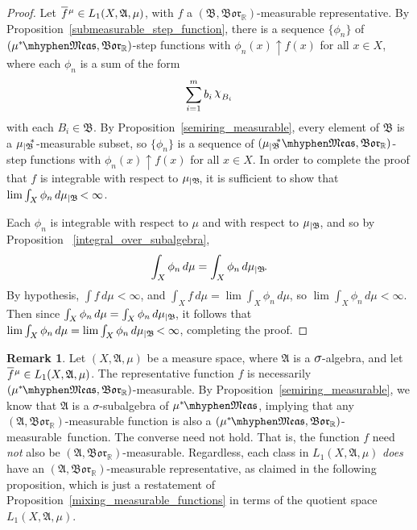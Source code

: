 \documentclass[
twoside=true,
paper=letter,
fontsize=9pt,
pagesize=auto,
leqno,
openany,
headsepline,
overfullrule,
]{scrbook}
\theoremstyle{plain}
\theoremstyle{plain}
\theoremstyle{definition}
\newtheorem{rmk}[thm]{Remark}
\theoremstyle{bfnoteitalic}
\theoremstyle{bfnoteroman}
\newcommand{\sigalg}[1]{\mathfrak{#1}}
\newcommand{\borel}{\mathfrak{Bor}}
\newcommand{\textsigma}{\hbox{\large{$\sigma$}}\kern-1pt}
\newcommand{\charfunction}[1]{\mathop{{\raisebox{2pt}{$\chi$}}_{#1}}}
\newcommand{\restrictedto}[1]{_{\lvert#1}\kern-1.5pt}
\newcommand{\R}{\mathbb{R}}
\newcommand{\sigmaalgebra}{\sigalg{A}}
\newcommand{\sigmaalgebraii}{\sigalg{B}}
\newcommand{\measurable}[1]{{#1}\mhyphen\mathfrak{Meas}}
\newcommand{\kernast}{\ast\kern-1pt}
\newcommand{\mbmeasurable}{$(\measurable{\measure^\kernast},\borel_\R)$\hyp{}measurable}
\newcommand{\measuresubstar}[1]{\measure\restrictedto{#1}\kern-2pt^*}
\newcommand{\funcf}{f}
\newcommand{\measurespace}{X}
\newcommand{\measure}{\mu}
\newcommand{\measmu}{\mu}
\newcommand{\setii}{B}
\newcommand*\xbar[1]{%
   \hbox{%
     \vbox{%
       \hrule height 0.4pt %
       \kern0.4ex%
       \hbox{%
         \ensuremath{#1}%
       }%
     }%
   }%
}
\newcommand{\lebclass}[1]{\hspace{.5pt}\xbar{#1}\hspace{0.5pt}}
\newcommand{\ellclass}[2]{\lebclass{#1}^{#2}}
\begin{document}
\begin{proof}
Let
$\ellclass{\funcf}{\measmu} \in L_1(\measurespace, \sigmaalgebra, \measure)$,
with $\funcf$ a
$(\sigmaalgebraii, \borel_\R)$\hyp{}measurable representative.
By Proposition~\ref{submeasurable_step_function}, there is a sequence
$\{ \phi_n \}$ of
$(\measurable{\measmu^\kernast}, \borel_\R)$\hyp{}step functions with
$\phi_n(x) \uparrow f(x)$ for all $x\in\measurespace$, where each $\phi_n$ is a sum of the form
\[
\sum_{i=1}^m b_i \charfunction{\setii_i}
\]
with each $\setii_i \in \sigmaalgebraii$.
By Proposition~\ref{semiring_measurable}, every element of $\sigmaalgebraii$ is a $\measuresubstar{\sigmaalgebraii}$-measurable subset,
so $\{\phi_n\}$ is a sequence of $(\measurable{\measuresubstar{\sigmaalgebraii}},\borel_\R)$-step functions with
$\phi_n(x) \uparrow f(x)$ for all $x\in\measurespace$.
In order to complete the proof that $f$ is integrable with respect to
$\measmu\restrictedto{\sigmaalgebraii}$, it is sufficient to show that
$\lim \int_\measurespace \phi_n \, d \measure\restrictedto{\sigmaalgebraii} < \infty$.

Each $\phi_n$ is integrable with respect to $\measmu$ and with respect to
$\measmu\restrictedto{\sigmaalgebraii}$, and so by
Proposition ~\ref{integral_over_subalgebra},
\[
\int_\measurespace \phi_n \, d\measure
= \int_\measurespace \phi_n \, d\measure\restrictedto{\sigmaalgebraii}.
\]
By hypothesis, $\int \funcf \, d\measmu < \infty$, and
$\int_\measurespace f \, d\measure
=
\lim\int_\measurespace \phi_n \, d\measure$,
so
$\lim\int_\measurespace \phi_n \, d\measure <\infty$.
Then since 
$\int_\measurespace \phi_n \, d\measure
= 
\int_\measurespace \phi_n \, d\measure\restrictedto{\sigmaalgebraii}$,
it follows that 
$\lim\int_\measurespace \phi_n \, d\measure
= 
\lim\int_\measurespace \phi_n \, d\measure\restrictedto{\sigmaalgebraii}<\infty$, completing the proof.
\end{proof}




\begin{rmk}
Let $(\measurespace,\sigmaalgebra,\measure)$ be a measure space, where $\sigmaalgebra$ is a $\textsigma$-algebra, and let $\ellclass{f}{\measure}\in L_1(\measurespace, \sigmaalgebra, \measure)$.  The representative function $f$ is necessarily \mbmeasurable. By Proposition~\ref{semiring_measurable}, we know that $\sigmaalgebra$ is a \textsigma-subalgebra of $\measurable{\measure^\kernast}$, implying that any  
$(\sigmaalgebra, \borel_\R)$\hyp{}measurable function is also a  \mbmeasurable\ function.  The converse need not hold.  That is, the function $f$ need \emph{not} also be $(\sigmaalgebra, \borel_\R)$\hyp{}measurable. Regardless, each class in
$L_1(\measurespace, \sigmaalgebra, \measure)$ \emph{does} have an
$(\sigmaalgebra, \borel_\R)$\hyp{}measurable representative, as claimed in the following proposition, which is just a restatement of Proposition~\ref{mixing_measurable_functions} in terms of the quotient space $L_1(\measurespace, \sigmaalgebra, \measure)$. 
\end{rmk}
\end{document}
